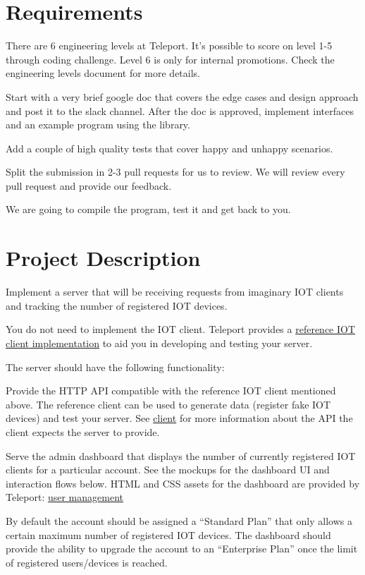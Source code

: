 \documentclass{article}
\begin{document}
\section{Requirements}

  There are 6 engineering levels at Teleport. It's possible to score on level 1-5 through coding challenge.
  Level 6 is only for internal promotions. Check the engineering levels document for more details.

  Start with a very brief google doc that covers the edge cases and design approach and post it to the slack channel. After the doc is approved, implement interfaces and an example program using the library.

  Add a couple of high quality tests that cover happy and unhappy scenarios.

  Split the submission in 2-3 pull requests for us to review. We will review every pull request and provide our feedback.

  We are going to compile the program, test it and get back to you.

  \section{Project Description}

  Implement a server that will be receiving requests from imaginary IOT clients and tracking the number of registered IOT devices.

  You do not need to implement the IOT client. Teleport provides a \href{https://github.com/gravitational/fakeiot}{reference IOT client implementation} to aid you in developing and testing your server.

  The server should have the following functionality:

  Provide the HTTP API compatible with the reference IOT client mentioned above. The reference client can be used to generate data (register fake IOT devices) and test your server. See \href{https://github.com/gravitational/fakeiot}{client} for more information about the API the client expects the server to provide.

Serve the admin dashboard that displays the number of currently registered IOT clients for a particular account. See the mockups for the dashboard UI and interaction flows below. HTML and CSS assets for the dashboard are provided by Teleport: \href{https://github.com/gravitational/challenge-user-management}{user management}

By default the account should be assigned a “Standard Plan” that only allows a certain maximum number of registered IOT devices. The dashboard should provide the ability to upgrade the account to an “Enterprise Plan” once the limit of registered users/devices is reached.
\end{document}
